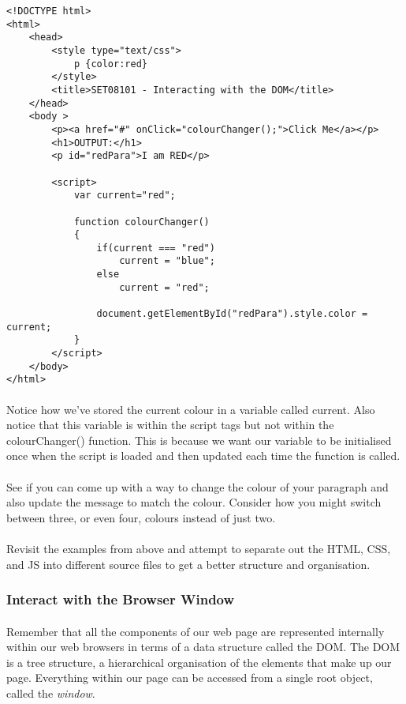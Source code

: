 \documentclass[10pt, a4paper, twosize]{article}
\begin{document}
\begin{lstlisting}
<!DOCTYPE html>
<html>
    <head>
        <style type="text/css">
            p {color:red}
        </style>
        <title>SET08101 - Interacting with the DOM</title>
    </head>
    <body >
        <p><a href="#" onClick="colourChanger();">Click Me</a></p>
        <h1>OUTPUT:</h1>
        <p id="redPara">I am RED</p>

        <script>
            var current="red";
            
            function colourChanger() 
            { 
                if(current === "red")
                    current = "blue";
                else
                    current = "red";

                document.getElementById("redPara").style.color = current;
            }      
        </script>
    </body>
</html>
\end{lstlisting}

\paragraph{} Notice how we've stored the current colour in a variable called current. Also notice that this variable is within the script tags but not within the colourChanger() function. This is because we want our variable to be initialised once when the script is loaded and then updated each time the function is called.

\paragraph{} See if you can come up with a way to change the colour of your paragraph and also update the message to match the colour. Consider how you might switch between three, or even four, colours instead of just two.

\paragraph{} Revisit the examples from above and attempt to separate out the HTML, CSS, and JS into different source files to get a better structure and organisation.

\subsubsection{Interact with the Browser Window}
\paragraph{} Remember that all the components of our web page are represented internally within our web browsers in terms of a data structure called the DOM. The DOM is a tree structure, a hierarchical organisation of the elements that make up our page. Everything within our page can be accessed from a single root object, called the \emph{window}.
\end{document}
